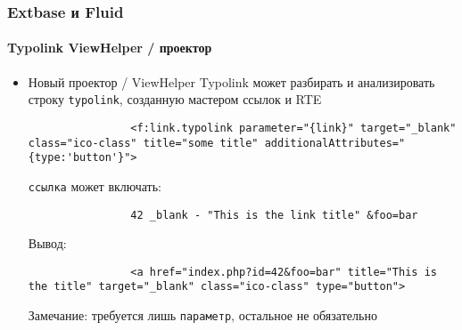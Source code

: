
\begin{frame}[fragile]
	\frametitle{Extbase и Fluid}
	\framesubtitle{Typolink ViewHelper / проектор}

	\lstset{
		basicstyle=\tiny\ttfamily
	}

	\begin{itemize}
		\item Новый проектор / ViewHelper Typolink может разбирать и анализировать строку \texttt{typolink}, созданную мастером ссылок и RTE

			\begin{lstlisting}
				<f:link.typolink parameter="{link}" target="_blank" class="ico-class" title="some title" additionalAttributes="{type:'button'}">
			\end{lstlisting}

			\texttt{ссылка} может включать:
			\begin{lstlisting}
				42 _blank - "This is the link title" &foo=bar
			\end{lstlisting}

			Вывод:
			\begin{lstlisting}
				<a href="index.php?id=42&foo=bar" title="This is the title" target="_blank" class="ico-class" type="button">
			\end{lstlisting}

			Замечание: требуется лишь \texttt{параметр}, остальное не обязательно

	\end{itemize}

\end{frame}



